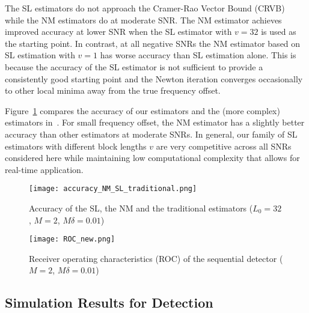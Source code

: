 The SL estimators do not approach the Cramer-Rao Vector Bound (CRVB)~\cite{Gini_98} while the NM
estimators do at moderate SNR. 
The NM estimator achieves improved accuracy at lower SNR
when the SL estimator with $v=32$ is used as the starting point. 
In contrast, at all negative SNRs the NM estimator based on SL estimation with $v=1$ has
worse accuracy than SL estimation alone.
This is because the accuracy of the SL estimator is not sufficient to
provide a consistently good starting point and the Newton iteration converges occasionally to 
other local minima away from the true frequency offset.

Figure~\ref{fig:accuracy_NM_SL_traditional} compares the accuracy of our  estimators
and the (more complex) estimators in~\cite{kay_89,Fitz_94,Luise_Reggiannini_95}.
For small
frequency offset, the NM estimator has a slightly better accuracy than other estimators at moderate SNRs.
In general, our family of  SL estimators with different block lengths $v$
are very competitive across all SNRs considered here while maintaining
low computational complexity that allows for real-time application.

\begin{figure}[t]
    \centerline{\texttt{[image: accuracy\_NM\_SL\_traditional.png]}}
    \caption{Accuracy of the SL, the NM and the traditional estimators ($L_0=32$, $M=2$, $M\delta=0.01$)}
    \label{fig:accuracy_NM_SL_traditional}
    \end{figure}

\begin{figure}[t]
  \centerline{\texttt{[image: ROC\_new.png]}}
  \caption{Receiver operating characteristics (ROC) of the sequential detector ($M=2$, $M\delta=0.01$)}
  \label{fig:Receiver operating characteristics}
\end{figure}


\subsection{Simulation Results for Detection}


